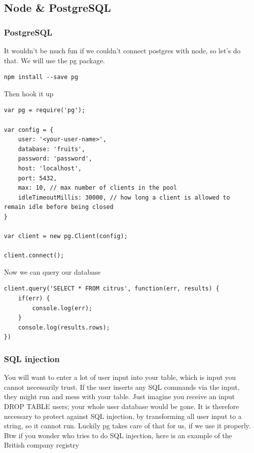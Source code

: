 \documentclass[a4paper]{article}
\begin{document}
\subsection{Node \& PostgreSQL}
\subsubsection{PostgreSQL}
It wouldn’t be much fun if we couldn’t connect postgres with node, so let’s do that. We will use the pg package.
\begin{lstlisting}
npm install --save pg
\end{lstlisting}
Then hook it up
\begin{lstlisting}
var pg = require('pg');

var config = {
    user: '<your-user-name>',
    database: 'fruits',
    password: 'password',
    host: 'localhost',
    port: 5432,
    max: 10, // max number of clients in the pool
    idleTimeoutMillis: 30000, // how long a client is allowed to remain idle before being closed
}

var client = new pg.Client(config);

client.connect();
\end{lstlisting}
Now we can query our database
\begin{lstlisting}
client.query('SELECT * FROM citrus', function(err, results) {
    if(err) {
        console.log(err);
    }
    console.log(results.rows);
})
\end{lstlisting}
\begin{eg}

\end{eg}
\subsubsection{SQL injection}
You will want to enter a lot of user input into your table, which is input you cannot necessarily trust. If the user inserts any SQL commands via the input, they might run and mess with your table. Just imagine you receive an input DROP TABLE users; your whole user database would be gone. It is therefore necessary to protect against SQL injection, by transforming all user input to a string, so it cannot run. Luckily pg takes care of that for us, if we use it properly.\\

Btw if you wonder who tries to do SQL injection, here is an example of the British company registry\\
\end{document}
